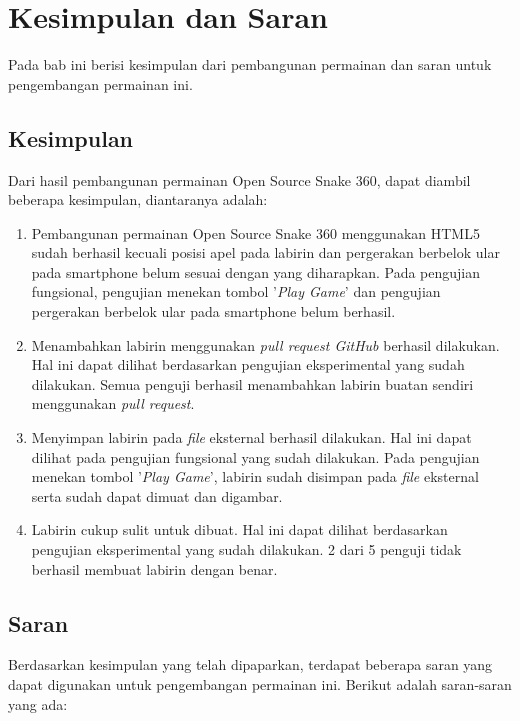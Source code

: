 \chapter{Kesimpulan dan Saran}
\label{chap:kesimpulansaran}

Pada bab ini berisi kesimpulan dari pembangunan permainan dan saran untuk pengembangan permainan ini.

\section{Kesimpulan}
Dari hasil pembangunan permainan Open Source Snake 360, dapat diambil beberapa kesimpulan, diantaranya adalah: 

\begin{enumerate}
	\item Pembangunan permainan Open Source Snake 360 menggunakan HTML5 sudah berhasil kecuali posisi apel pada labirin dan pergerakan berbelok ular pada smartphone belum sesuai dengan yang diharapkan. Pada pengujian fungsional, pengujian menekan tombol '\textit{Play Game}' dan pengujian pergerakan berbelok ular pada smartphone belum berhasil.
	\item Menambahkan labirin menggunakan \textit{pull request GitHub} berhasil dilakukan. Hal ini dapat dilihat berdasarkan pengujian eksperimental yang sudah dilakukan. Semua penguji berhasil menambahkan labirin buatan sendiri menggunakan \textit{pull request}.
	\item Menyimpan labirin pada \textit{file} eksternal berhasil dilakukan. Hal ini dapat dilihat pada pengujian fungsional yang sudah dilakukan. Pada pengujian menekan tombol '\textit{Play Game}', labirin sudah disimpan pada \textit{file} eksternal serta sudah dapat dimuat dan digambar.
	\item Labirin cukup sulit untuk dibuat. Hal ini dapat dilihat berdasarkan pengujian eksperimental yang sudah dilakukan. 2 dari 5 penguji tidak berhasil membuat labirin dengan benar.
\end{enumerate} 

\section{Saran}
Berdasarkan kesimpulan yang telah dipaparkan, terdapat beberapa saran yang dapat digunakan untuk pengembangan permainan ini. Berikut adalah saran-saran yang ada:

